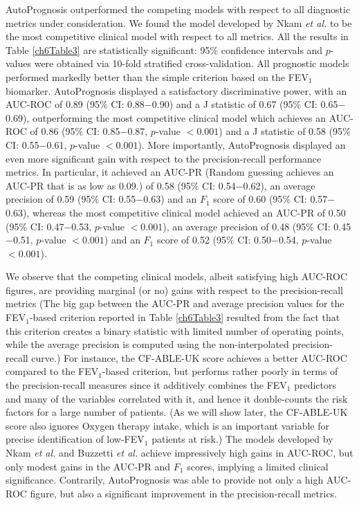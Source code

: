 \documentclass [PhD] {uclathes}
\begin{document}
AutoPrognosis outperformed the competing models with respect to all diagnostic metrics under consideration. We found the model developed by Nkam {\it et al.} \cite{nkam20173} to be the most competitive clinical model with respect to all metrics. All the results in Table \ref{ch6Table3} are statistically significant: 95$\%$ confidence intervals and $p$-values were obtained via 10-fold stratified cross-validation. All prognostic models performed markedly better than the simple criterion based on the FEV$_1$ biomarker. AutoPrognosis displayed a satisfactory discriminative power, with an AUC-ROC of 0.89 (95$\%$ CI: 0.88$-$0.90) and a J statistic of 0.67 (95$\%$ CI: 0.65$-$0.69), outperforming the most competitive clinical model which achieves an AUC-ROC of 0.86 (95$\%$ CI: 0.85$-$0.87, $p$-value $<0.001$) and a J statistic of 0.58 (95$\%$ CI: 0.55$-$0.61, $p$-value $<0.001$). More importantly, AutoPrognosis displayed an even more significant gain with respect to the precision-recall performance metrics. In particular, it achieved an AUC-PR (Random guessing achieves an AUC-PR that is as low as 0.09.) of 0.58 (95$\%$ CI: 0.54$-$0.62), an average precision of 0.59 (95$\%$ CI: 0.55$-$0.63) and an $F_1$ score of 0.60 (95$\%$ CI: 0.57$-$0.63), whereas the most competitive clinical model achieved an AUC-PR of 0.50 (95$\%$ CI: 0.47$-$0.53, $p$-value $<0.001$), an average precision of 0.48 (95$\%$ CI: 0.45$-$0.51, $p$-value $<0.001$) and an $F_1$ score of 0.52 (95$\%$ CI: 0.50$-$0.54, $p$-value $<0.001$). 

We observe that the competing clinical models, albeit satisfying high AUC-ROC figures, are providing marginal (or no) gains with respect to the precision-recall metrics (The big gap between the AUC-PR and average precision values for the FEV$_1$-based criterion reported in Table \ref{ch6Table3} resulted from the fact that this criterion creates a binary statistic with limited number of operating points, while the average precision is computed using the non-interpolated precision-recall curve.) For instance, the CF-ABLE-UK score achieves a better AUC-ROC compared to the FEV$_1$-based criterion, but performs rather poorly in terms of the precision-recall measures since it additively combines the FEV$_1$ predictors and many of the variables correlated with it, and hence it double-counts the risk factors for a large number of patients. (As we will show later, the CF-ABLE-UK score also ignores Oxygen therapy intake, which is an important variable for precise identification of low-FEV$_1$ patients at risk.) The models developed by Nkam {\it et al.} and Buzzetti {\it et al.} achieve impressively high gains in AUC-ROC, but only modest gains in the AUC-PR and $F_1$ scores, implying a limited clinical significance. Contrarily, AutoPrognosis was able to provide not only a high AUC-ROC figure, but also a significant improvement in the precision-recall metrics. 
\end{document}
